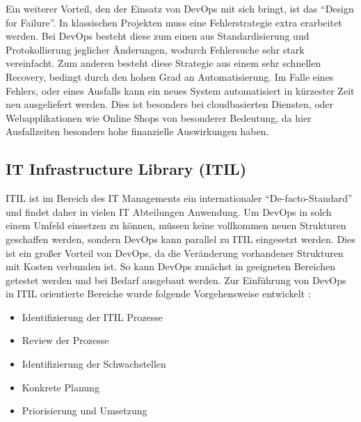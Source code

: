 Ein weiterer Vorteil, den der Einsatz von DevOps mit sich bringt, ist das \enquote{Design for Failure}. 
In klassischen Projekten muss eine Fehlerstrategie extra erarbeitet werden. Bei DevOps besteht diese zum einen aus Standardisierung und Protokollierung jeglicher Änderungen, wodurch Fehlersuche sehr stark vereinfacht. 
Zum anderen besteht diese Strategie aus einem sehr schnellen Recovery, bedingt durch den hohen Grad an Automatisierung. 
Im Falle eines Fehlers, oder eines Ausfalls kann ein neues System automatisiert in kürzester Zeit neu ausgeliefert werden. 
Dies ist besonders bei cloudbasierten Diensten, oder Webapplikationen wie Online Shops von besonderer Bedeutung, da hier Ausfallzeiten besonders hohe finanzielle Auswirkungen haben. 
\parencite[Vgl.][]{Null:2014}

\subsection{IT Infrastructure Library (ITIL)}
ITIL ist im Bereich des IT Managements ein internationaler \enquote{De-facto-Standard} und findet daher in vielen IT Abteilungen Anwendung. 
Um DevOps in solch einem Umfeld einsetzen zu können, müssen keine vollkommen neuen Strukturen geschaffen werden, sondern DevOps kann parallel zu ITIL eingesetzt werden. 
Dies ist ein großer Vorteil von DevOps, da die Veränderung vorhandener Strukturen mit Kosten verbunden ist. 
So kann DevOps zunächst in geeigneten Bereichen getestet werden und bei Bedarf ausgebaut werden.
Zur Einführung von DevOps in ITIL orientierte Bereiche wurde folgende Vorgehensweise entwickelt \parencite[vgl.][]{Sharp-Paul:2016}:

\begin{itemize}
\item Identifizierung der ITIL Prozesse
\item Review der Prozesse
\item Identifizierung der Schwachstellen
\item Konkrete Planung
\item Priorisierung und Umsetzung
\end{itemize}

